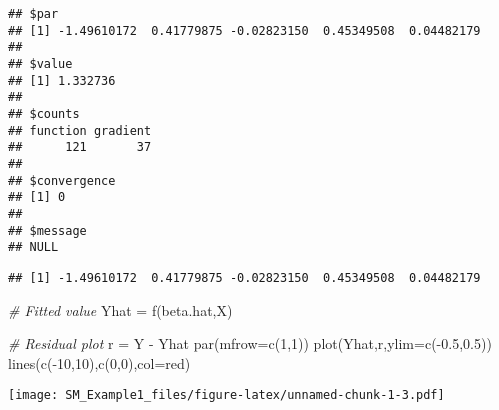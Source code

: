 \documentclass[
]{article}
\newenvironment{Shaded}{\begin{snugshade}}{\end{snugshade}}
\newcommand{\AttributeTok}[1]{\textcolor[rgb]{0.77,0.63,0.00}{#1}}
\newcommand{\CommentTok}[1]{\textcolor[rgb]{0.56,0.35,0.01}{\textit{#1}}}
\newcommand{\DecValTok}[1]{\textcolor[rgb]{0.00,0.00,0.81}{#1}}
\newcommand{\FloatTok}[1]{\textcolor[rgb]{0.00,0.00,0.81}{#1}}
\newcommand{\FunctionTok}[1]{\textcolor[rgb]{0.00,0.00,0.00}{#1}}
\newcommand{\NormalTok}[1]{#1}
\newcommand{\OtherTok}[1]{\textcolor[rgb]{0.56,0.35,0.01}{#1}}
\newcommand{\SpecialCharTok}[1]{\textcolor[rgb]{0.00,0.00,0.00}{#1}}
\newcommand{\StringTok}[1]{\textcolor[rgb]{0.31,0.60,0.02}{#1}}
\begin{document}
\begin{verbatim}
## $par
## [1] -1.49610172  0.41779875 -0.02823150  0.45349508  0.04482179
## 
## $value
## [1] 1.332736
## 
## $counts
## function gradient 
##      121       37 
## 
## $convergence
## [1] 0
## 
## $message
## NULL
\end{verbatim}

\begin{Shaded}
\end{Shaded}

\begin{verbatim}
## [1] -1.49610172  0.41779875 -0.02823150  0.45349508  0.04482179
\end{verbatim}

\begin{Shaded}
\begin{Highlighting}[]
\CommentTok{\# Fitted value}
\NormalTok{Yhat }\OtherTok{=} \FunctionTok{f}\NormalTok{(beta.hat,X)}

\CommentTok{\# Residual plot}
\NormalTok{r }\OtherTok{=}\NormalTok{ Y }\SpecialCharTok{{-}}\NormalTok{ Yhat}
\FunctionTok{par}\NormalTok{(}\AttributeTok{mfrow=}\FunctionTok{c}\NormalTok{(}\DecValTok{1}\NormalTok{,}\DecValTok{1}\NormalTok{))}
\FunctionTok{plot}\NormalTok{(Yhat,r,}\AttributeTok{ylim=}\FunctionTok{c}\NormalTok{(}\SpecialCharTok{{-}}\FloatTok{0.5}\NormalTok{,}\FloatTok{0.5}\NormalTok{))}
\FunctionTok{lines}\NormalTok{(}\FunctionTok{c}\NormalTok{(}\SpecialCharTok{{-}}\DecValTok{10}\NormalTok{,}\DecValTok{10}\NormalTok{),}\FunctionTok{c}\NormalTok{(}\DecValTok{0}\NormalTok{,}\DecValTok{0}\NormalTok{),}\AttributeTok{col=}\StringTok{\textquotesingle{}red\textquotesingle{}}\NormalTok{)}
\end{Highlighting}
\end{Shaded}

\texttt{[image: SM\_Example1\_files/figure-latex/unnamed-chunk-1-3.pdf]}
\end{document}
